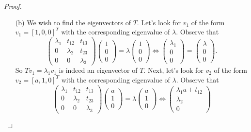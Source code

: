 \documentclass[12pt]{report}
\begin{document}
\begin{problem}
\begin{proof}
\begin{enumerate}
     \item [(b)]
     We wish to find the eigenvectors of $T$. Let's look for $v_1$ of the form $v_1 = [1,0,0]^T$ with the corresponding eigenvalue of $\lambda$. Observe that
     \[
          \begin{pmatrix}
               \lambda_1 & t_{12} & t_{13}\\ 0 & \lambda_2 & t_{23}\\ 0 & 0 & \lambda_3
          \end{pmatrix}\begin{pmatrix}
               1 \\ 0 \\ 0
          \end{pmatrix} = \lambda \begin{pmatrix}
               1 \\ 0 \\ 0
          \end{pmatrix} \iff \begin{pmatrix}
               \lambda_1 \\ 0 \\0 
          \end{pmatrix}  = \begin{pmatrix}
               \lambda \\ 0 \\ 0
          \end{pmatrix}.
     \]
     So $Tv_1 = \lambda_1 v_1$ is indeed an eigenvector of $T$. Next, let's look for $v_2$ of the form $v_2 = [a,1,0]^T$ with the corresponding eigenvalue of $\lambda$. Observe that
     \[
          \begin{pmatrix}
               \lambda_1 & t_{12} & t_{13}\\ 0 & \lambda_2 & t_{23}\\ 0 & 0 & \lambda_3
          \end{pmatrix}\begin{pmatrix}
               a \\ 1 \\ 0
          \end{pmatrix} = \lambda \begin{pmatrix}
               a \\ 1 \\ 0
          \end{pmatrix} \iff \begin{pmatrix}
               \lambda_1 a + t_{12} \\ \lambda_2 \\0 

\end{pmatrix}\]
\end{enumerate}
\end{proof}
\end{problem}
\end{document}
